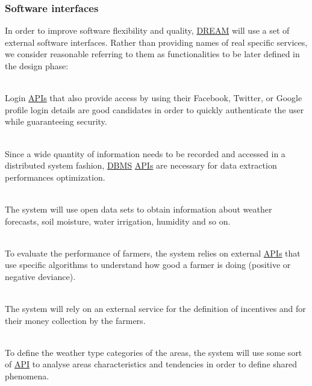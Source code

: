 \subsubsection{Software interfaces}
In order to improve software flexibility and quality, \hyperref[tab:acronymsTable]{DREAM} will use a set of external software interfaces. Rather than providing names of real specific services, we consider reasonable referring to them as functionalities to be later defined in the design phase:
\begin{description}[font=~\normalfont\scshape]
    \item[\textbf{\textcolor{myblue}{universal logins}}] \hfill \\Login \hyperref[tab:acronymsTable]{APIs} that also provide access by using their Facebook, Twitter, or Google profile login details are good candidates in order to quickly authenticate the user while guaranteeing security.
    \item[\textbf{\textcolor{myblue}{big data manipulation}}] \hfill \\Since a wide quantity of information needs to be recorded and accessed in a distributed system fashion, \hyperref[tab:acronymsTable]{DBMS} \hyperref[tab:acronymsTable]{APIs} are necessary for data extraction performances optimization.
    \item[\textbf{\textcolor{myblue}{third party data sets access}}] \hfill \\
    The system will use open data sets to obtain information about weather forecasts, soil moisture, water irrigation, humidity and so on.
    \item[\textbf{\textcolor{myblue}{farmers evaluation}}] \hfill \\
    To evaluate the performance of farmers, the system relies on external \hyperref[tab:acronymsTable]{APIs} that use specific algorithms to understand how good a farmer is doing (positive or negative deviance).
    \item[\textbf{\textcolor{myblue}{incentives management}}] \hfill \\
    The system will rely on an external service for the definition of incentives and for their money collection by the farmers.
    \item[\textbf{\textcolor{myblue}{weather types categorization}}] \hfill \\
    To define the weather type categories of the areas, the system will use some sort of \hyperref[tab:acronymsTable]{API} to analyse areas characteristics and tendencies in order to define shared phenomena. 
    
    
\end{description}

